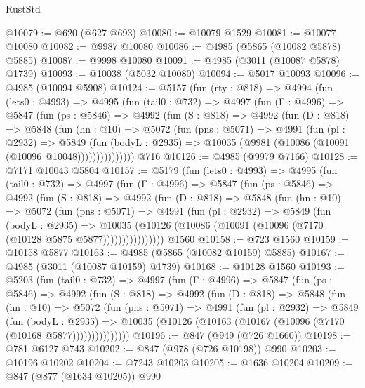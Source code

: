 \begin{lexlean}{RustStd}
\begin{coremodule}
@10079 := @620 (@627 @693)
@10080 := @10079 @1529
@10081 := @10077 @10080
@10082 := @9987 @10080
@10086 := @4985 (@5865 (@10082 @5878) @5885)
@10087 := @9998 @10080
@10091 := @4985 (@3011 (@10087 @5878) @1739)
@10093 := @10038 (@5032 @10080)
@10094 := @5017 @10093
@10096 := @4985 (@10094 @5908)
@10124 := @5157
    (fun (rty : @818) =>
    @4994
      (fun (lets0 : @4993) =>
      @4995
        (fun (tail0 : @732) =>
        @4997
          (fun (Γ : @4996) =>
          @5847
            (fun (ps : @5846) =>
            @4992
              (fun (S : @818) =>
              @4992
                (fun (D : @818) =>
                @5848
                  (fun (hn : @10) =>
                  @5072
                    (fun (pns : @5071) =>
                    @4991
                      (fun (pl : @2932) =>
                      @5849
                        (fun (bodyL : @2935) =>
                        @10035 (@9981 (@10086 (@10091 (@10096 @10048)))))))))))))))
    @716
@10126 := @4985 (@9979 @7166)
@10128 := @7171 @10043 @5804
@10157 := @5179
    (fun (lets0 : @4993) =>
    @4995
      (fun (tail0 : @732) =>
      @4997
        (fun (Γ : @4996) =>
        @5847
          (fun (ps : @5846) =>
          @4992
            (fun (S : @818) =>
            @4992
              (fun (D : @818) =>
              @5848
                (fun (hn : @10) =>
                @5072
                  (fun (pns : @5071) =>
                  @4991
                    (fun (pl : @2932) =>
                    @5849
                      (fun (bodyL : @2935) =>
                      @10035
                        (@10126 (@10086 (@10091 (@10096 (@7170 (@10128 @5875 @5877))))))))))))))))
    @1560
@10158 := @723 @1560
@10159 := @10158 @5877
@10163 := @4985 (@5865 (@10082 @10159) @5885)
@10167 := @4985 (@3011 (@10087 @10159) @1739)
@10168 := @10128 @1560
@10193 := @5203
    (fun (tail0 : @732) =>
    @4997
      (fun (Γ : @4996) =>
      @5847
        (fun (ps : @5846) =>
        @4992
          (fun (S : @818) =>
          @4992
            (fun (D : @818) =>
            @5848
              (fun (hn : @10) =>
              @5072
                (fun (pns : @5071) =>
                @4991
                  (fun (pl : @2932) =>
                  @5849
                    (fun (bodyL : @2935) =>
                    @10035 (@10126 (@10163 (@10167 (@10096 (@7170 (@10168 @5877)))))))))))))))
@10196 := @847 (@949 (@726 @1660))
@10198 := @781 @6127 @743
@10202 := @847 (@978 (@726 @10198)) @990
@10203 := @10196 @10202
@10204 := @7243 @10203
@10205 := @1636 @10204
@10209 := @847 (@877 (@1634 @10205)) @990

\end{coremodule}
\end{lexlean}
